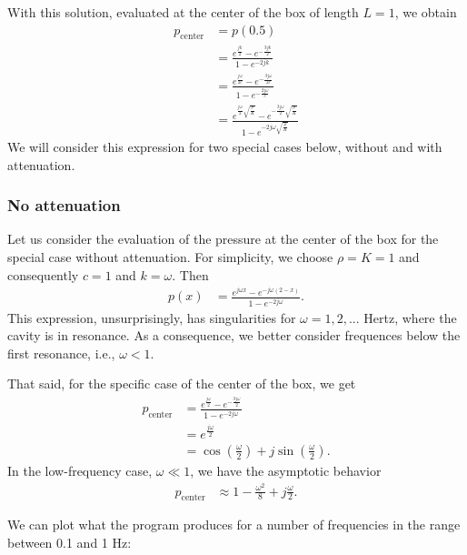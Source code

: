 \documentclass{article}
\begin{document}
With this solution, evaluated at the center of the box of length
$L=1$, we obtain
\begin{align*}
  p_\text{center} &= p(0.5)
  \\
  &= \frac{e^{\frac{jk}{2}} - e^{-\frac{3jk}{2}}}{1 - e^{-2jk}}
  \\
  &= \frac{e^{\frac{j\omega}{2c}} - e^{-\frac{3j\omega}{2c}}}{1 - e^{-\frac{2j\omega}{c}}}
  \\
  &= \frac{e^{\frac{j\omega}{2}\sqrt{\frac{\rho}{K}}} - e^{-\frac{3j\omega}{2}\sqrt{\frac{\rho}{K}}}}{1 - e^{-2j\omega\sqrt{\frac{\rho}{K}}}}
\end{align*}
We will consider this expression for two special cases below, without
and with attenuation.


\subsubsection*{No attenuation}

Let us consider the evaluation of the pressure at the center of the
box for the special case without attenuation. For simplicity, we
choose $\rho=K=1$ and consequently $c=1$ and $k=\omega$. Then
\begin{align*}
  p(x)
  &=
  \frac{e^{j\omega x} - e^{-j\omega (2-x)}}{1 - e^{-2j\omega}}.
\end{align*}
This expression, unsurprisingly, has singularities for
$\omega=1,2,...$ Hertz, where the cavity is in resonance. As a
consequence, we better consider frequences below the first resonance,
i.e., $\omega<1$.

That said, for the specific case of the center of the box, we get
\begin{align*}
  p_\text{center}
  &= \frac{e^{\frac{j\omega}{2}} - e^{-\frac{3j\omega}{2}}}{1 -
    e^{-2j\omega}}
  \\
  &= e^{\frac{j\omega}{2}} \\
  &= \cos\left({\frac{\omega}{2}}\right)
  + j \sin\left({\frac{\omega}{2}}\right).
\end{align*}
In the low-frequency case, $\omega\ll 1$, we have the asymptotic
behavior
\begin{align*}
  p_\text{center}
  &\approx
  1-\frac{\omega^2}{8} + j \frac{\omega}{2}.
\end{align*}

We can plot what the program produces for a number of frequencies in
the range between 0.1 and 1 Hz:
%
%
\end{document}
